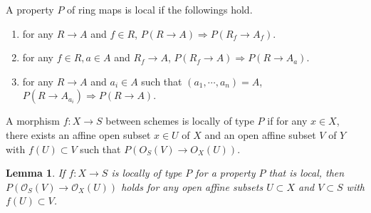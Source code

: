 \documentclass[leqno]{amsart}
\newcommand{\oo}{\mathcal O}
\newcommand{\1}{\mathbf{1}}
\newtheorem{lem}[thm]{Lemma}
\theoremstyle{definition}
\theoremstyle{remark}
\begin{document}
A property $P$ of ring maps is local if 
the followings hold.
\begin{enumerate}[label=(\alph*)]
	\item for any $R\to A$ and  $f\in R$,
		$P(R\to A)\Longrightarrow P(R_f\to A_f)$.
	\item for any  $f\in R, a\in A$ and  $R_f\to A$,
		$P(R_f\to A)\Longrightarrow P(R\to A_a)$.
	\item for any  $R\to A$ and  $a_i\in A$ 
		such that  $(a_1,\cdots,a_n)=A$,
		$P(R\to A_{a_i})\Longrightarrow P(R\to A)$.
\end{enumerate}
A morphism $f\colon X\to S$ between schemes 
is locally of type $P$ if for any  $x\in X$,
there exists an affine open subset  $x\in U$ of  $X$
and an open affine subset $V$ of $Y$ with  $f(U)\subset V$
such that $P(O_S(V)\to O_X(U))$.
\begin{lem}
	If $f\colon X\to S$ is locally of type  $P$
	for a property  $P$ that is local,
	then $P(\oo_S(V)\to \oo_X(U))$ holds
	for any open affine subsets 
	$U\subset X$ and  $V\subset S$
	with  $f(U)\subset V$.
\end{lem}

\end{document}
